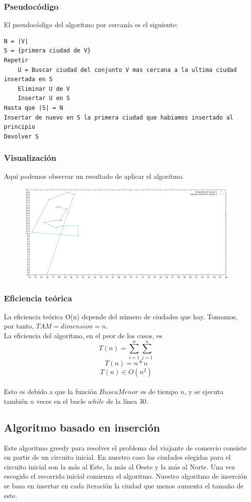 \documentclass[11pt,a4paper]{article} %
\begin{document}
\subsubsection{Pseudocódigo}
El pseudocódigo del algoritmo por cercanía es el siguiente:
\begin{lstlisting}
N = |V|
S = {primera ciudad de V}
Repetir
	U = Buscar ciudad del conjunto V mas cercana a la ultima ciudad insertada en S
	Eliminar U de V
	Insertar U en S
Hasta que |S| = N
Insertar de nuevo en S la primera ciudad que habiamos insertado al principio
Devolver S
\end{lstlisting}

\subsubsection{Visualización}
Aquí podemos observar un resultado de aplicar el algoritmo.
\begin{figure}[H]
	\centering
	\includegraphics[width=13cm]{data/graphics/cercania/cercania.pdf}
\end{figure}

\subsubsection{Eficiencia teórica}
La eficiencia teórica O(n) depende del número de ciudades que hay. Tomamos, por tanto, $TAM = dimension = n$.\\

La eficiencia del algoritmo, en el peor de los casos, es 
$$T(n) = \sum_{i=1}^{n}\sum_{j=1}^{n}$$
$$T(n) = n*n$$
$$T(n) \in O(n^2)$$\\

Esto es debido a que la función $BuscaMenor$ es de tiempo $n$, y se ejecuta también $n$ veces en el bucle $while$ de la línea 30.



\newpage
\subsection{Algoritmo basado en inserción}
Este algoritmo greedy para resolver el problema del viajante de comercio consiste en partir de un circuito inicial. En nuestro caso las ciudades elegidas para el circuito inicial son la más al Este, la más al Oeste y la más al Norte. Una vez escogido el recorrido inicial comienza el algoritmo. Nuestro algoritmo de inserción se basa en insertar en cada iteración la ciudad que menos aumenta el tamaño de este.
\end{document}
